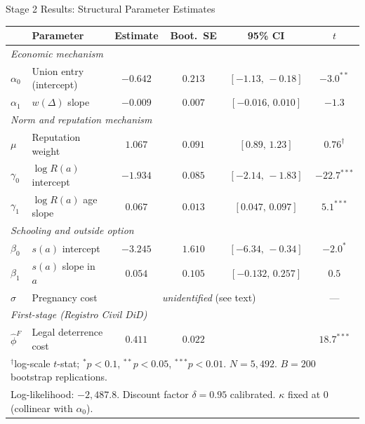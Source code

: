 \begin{frame}{Stage 2 Results: Structural Parameter Estimates}
    \centering
    \small
    \begin{tabular}{llcccc}
        \toprule
        & Parameter & Estimate & Boot.\ SE & 95\% CI & $t$ \\
        \midrule
        \multicolumn{6}{l}{\textit{Economic mechanism}} \\
        $\alpha_0$ & Union entry (intercept) & $-0.642$ & $0.213$ & $[-1.13,\,-0.18]$ & $-3.0^{**}$ \\
        $\alpha_1$ & $w(\Delta)$ slope       & $-0.009$ & $0.007$ & $[-0.016,\,0.010]$ & $-1.3$ \\
        \midrule
        \multicolumn{6}{l}{\textit{Norm and reputation mechanism}} \\
        $\mu$       & Reputation weight      & $1.067$  & $0.091$ & $[0.89,\,1.23]$    & $0.76^{\dagger}$ \\
        $\gamma_0$  & $\log R(a)$ intercept  & $-1.934$ & $0.085$ & $[-2.14,\,-1.83]$  & $-22.7^{***}$ \\
        $\gamma_1$  & $\log R(a)$ age slope  & $0.067$  & $0.013$ & $[0.047,\,0.097]$  & $5.1^{***}$ \\
        \midrule
        \multicolumn{6}{l}{\textit{Schooling and outside option}} \\
        $\beta_0$   & $s(a)$ intercept       & $-3.245$ & $1.610$ & $[-6.34,\,-0.34]$  & $-2.0^{*}$ \\
        $\beta_1$   & $s(a)$ slope in $a$    & $0.054$  & $0.105$ & $[-0.132,\,0.257]$ & $0.5$ \\
        $\sigma$    & Pregnancy cost         & \multicolumn{3}{c}{\textit{unidentified} (see text)} & --- \\
        \midrule
        \multicolumn{6}{l}{\textit{First-stage (Registro Civil DiD)}} \\
        $\hat\phi^F$ & Legal deterrence cost & $0.411$  & $0.022$ & & $18.7^{***}$ \\
        \bottomrule
        \multicolumn{6}{l}{\footnotesize $^{\dagger}$log-scale $t$-stat; $^{*}p{<}0.1$, $^{**}p{<}0.05$, $^{***}p{<}0.01$. $N=5{,}492$. $B=200$ bootstrap replications.} \\
        \multicolumn{6}{l}{\footnotesize Log-likelihood: $-2{,}487.8$. Discount factor $\delta=0.95$ calibrated. $\kappa$ fixed at 0 (collinear with $\alpha_0$).}
    \end{tabular}
\end{frame}

